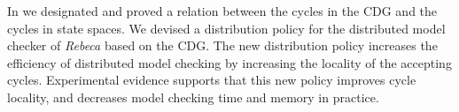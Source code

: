 In \cite{DBLP:journals/eceasst/KhamespanahSMSR15} we designated and proved a relation between the cycles in the CDG and the cycles in state spaces. We devised a distribution policy for the distributed model checker of \emph{Rebeca} based on the CDG. The new distribution policy increases the efficiency of distributed model checking by increasing the locality of the accepting cycles. Experimental evidence supports that this new policy improves cycle locality, and decreases model checking time and memory in practice.